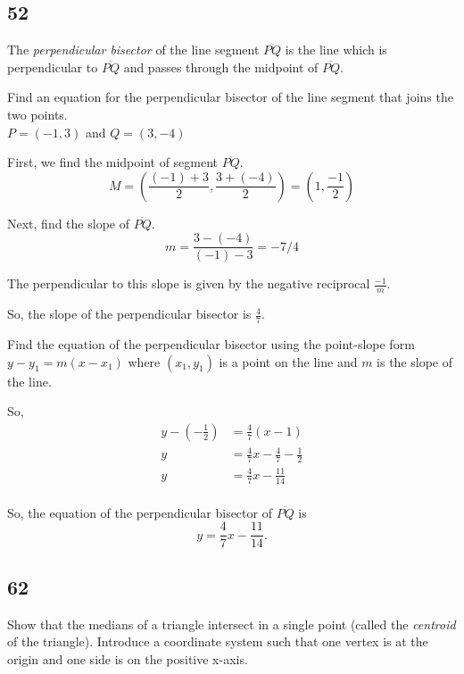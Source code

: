 \documentclass{article}
\begin{document}
\subsection*{52}

The \textit{perpendicular bisector} of the line segment $\overline{PQ}$ is the line which is perpendicular to $\overline{PQ}$ 
and passes through the midpoint of $\overline{PQ}$. 

Find an equation for the perpendicular bisector of the line segment that joins the two points. 
\\ $P = (-1,3)$ and $Q = (3,-4)$

First, we find the midpoint of segment $\overline{PQ}$.
\[M = \left( \frac{(-1)+3}{2}, \frac{3+(-4)}{2}\right) = \left( 1, \frac{-1}{2} \right)\]

Next, find the slope of $\overline{PQ}$.
\[m = \frac{3-(-4)}{(-1)-3} = -7/4\]

The perpendicular to this slope is given by the negative reciprocal $\frac{-1}{m}$.

So, the slope of the perpendicular bisector is $\frac{4}{7}$.

Find the equation of the perpendicular bisector using the point-slope form $y-y_1 = m(x-x_1)$ 
where $(x_1,y_1)$ is a point on the line and $m$ is the slope of the line.

So,
\begin{align*}
   y - \left( -\frac{1}{2} \right) &= \frac{4}{7} (x - 1) \\
   y &= \frac{4}{7}x - \frac{4}{7} - \frac{1}{2} \\
   y &= \frac{4}{7}x - \frac{11}{14} \\
\end{align*}

So, the equation of the perpendicular bisector of $\overline{PQ}$ is
\[y = \frac{4}{7}x - \frac{11}{14}.\]


\subsection*{62}

Show that the medians of a triangle intersect in a single point (called the \textit{centroid} of the triangle). 
Introduce a coordinate system such that one vertex is at the origin and one side is on the positive x-axis.

\begin{figure*}[ht] %
\centering
{}
\end{figure*}
\end{document}
